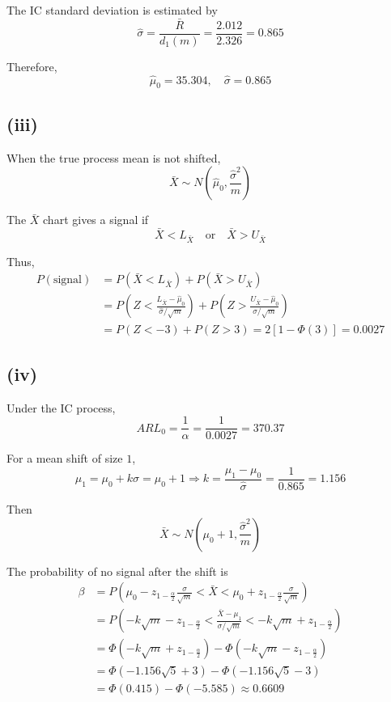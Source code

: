 \documentclass[a4paper, 12pt]{article}  %
\begin{document}
The IC standard deviation is estimated by
$$
\hat{\sigma}
=\frac{\bar R}{d_1(m)}
=\frac{2.012}{2.326}
=0.865
$$

Therefore,
$$
\hat{\mu}_0=35.304,\quad \hat{\sigma}=0.865
$$

\subsection*{(iii)}

When the true process mean is not shifted,
$$
\bar X
\sim
N\left(
\hat{\mu}_0,
\frac{\hat{\sigma}^2}{m}
\right)
$$

The \(\bar X\) chart gives a signal if
$$
\bar X<L_{\bar X}
\quad \text{or} \quad
\bar X>U_{\bar X}
$$

Thus,
\begin{align*}
P(\text{signal})
&=P\left(\bar X<L_{\bar X}\right)+P\left(\bar X>U_{\bar X}\right)\\
&=P\left(Z<\frac{L_{\bar X}-\hat{\mu}_0}{\hat{\sigma}/\sqrt m}\right)+P\left(Z>\frac{U_{\bar X}-\hat{\mu}_0}{\hat{\sigma}/\sqrt m}\right) \\
&=P(Z<-3)+P(Z>3)=2[1-\Phi(3)]=0.0027
\end{align*}

\subsection*{(iv)}

Under the IC process,
$$
ARL_0=\frac{1}{\alpha}=\frac{1}{0.0027}=370.37
$$

For a mean shift of size \(1\),
$$
\mu_1=\mu_0+k\sigma=\mu_0+1\Rightarrow k=\frac{\mu_1-\mu_0}{\hat{\sigma}}=\frac{1}{0.865}=1.156
$$

Then
$$
\bar X\sim N\left(\mu_0+1,\frac{\hat{\sigma}^2}{m}\right)
$$

The probability of no signal after the shift is
\begin{align*}
\beta
&=P\left(\mu_0-z_{1-\frac{\alpha}{2}}\frac{\sigma}{\sqrt m}<\bar X<\mu_0+z_{1-\frac{\alpha}{2}}\frac{\sigma}{\sqrt m}\right) \\
&=P\left(-k\sqrt m-z_{1-\frac{\alpha}{2}}<\frac{\bar X-\mu_1}{\sigma/\sqrt m}<-k\sqrt m+z_{1-\frac{\alpha}{2}}\right) \\
&=\Phi\left(-k\sqrt m+z_{1-\frac{\alpha}{2}}\right)-\Phi\left(-k\sqrt m-z_{1-\frac{\alpha}{2}}\right) \\
&=\Phi\left(-1.156\sqrt 5+3\right)-\Phi\left(-1.156\sqrt 5-3\right) \\
&=\Phi(0.415)-\Phi(-5.585) 
\approx 0.6609
\end{align*}
\end{document}
